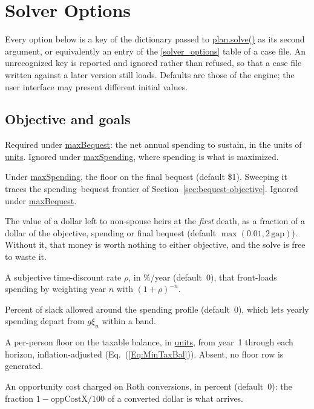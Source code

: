 \documentclass[fleqn,12pt]{report}
\newcommand{\code}[1]{\url{#1}}
\begin{document}
\chapter{Solver Options}
\label{Chap:Options}

Every option below is a key of the dictionary passed to \code{plan.solve()} as
its second argument, or equivalently an entry of the \code{[solver_options]}
table of a case file.
An unrecognized key is reported and ignored rather than refused, so that a case
file written against a later version still loads.
Defaults are those of the engine; the user interface may present different
initial values.

\section{Objective and goals}

\begin{description}[style=nextline, leftmargin=1.5cm, font=\ttfamily]
\item[netSpending]
Required under \code{maxBequest}: the net annual spending to sustain, in the
units of \code{units}.  Ignored under \code{maxSpending}, where spending is
what is maximized.
\item[bequest]
Under \code{maxSpending}, the floor on the final bequest (default \$1).
Sweeping it traces the spending--bequest frontier of
Section~\ref{sec:bequest-objective}.  Ignored under \code{maxBequest}.
\item[partialBequestWeight]
The value of a dollar left to non-spouse heirs at the \emph{first} death, as a
fraction of a dollar of the objective, spending or final bequest (default
$\max(0.01, 2\,\textrm{gap})$).  Without it, that money is worth nothing to
either objective, and the solve is free to waste it.
\item[timePreference]
A subjective time-discount rate $\rho$, in \%/year (default~0), that front-loads
spending by weighting year $n$ with $(1+\rho)^{-n}$.
\item[spendingSlack]
Percent of slack allowed around the spending profile (default~0), which lets
yearly spending depart from $g\xi_n$ within a band.
\item[minTaxableBalance]
A per-person floor on the taxable balance, in \code{units}, from year~1 through
each horizon, inflation-adjusted (Eq.~(\ref{Eq:MinTaxBal})).  Absent, no floor
row is generated.
\item[oppCostX]
An opportunity cost charged on Roth conversions, in percent (default~0): the
fraction $1 - \textrm{oppCostX}/100$ of a converted dollar is what arrives.
\end{description}
\end{document}
